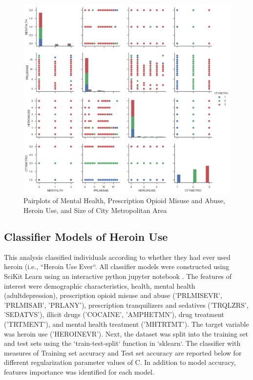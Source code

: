 \documentclass[sigconf]{acmart}
\begin{document}
\begin{figure}[!ht]
  \centering\includegraphics[width=\columnwidth]{images/Figure3.pdf}
  \caption{Pairplots of Mental Health, Prescription Opioid Misuse and Abuse,
  Heroin Use, and Size of City Metropolitan Area}
  \label{f:Figure3}
\end{figure}


\subsection{Classifier Models of Heroin Use}

This analysis classified individuals according to whether they had ever used 
heroin (i.e., ``Heroin Use Ever``. All classifier models were constructed 
using SciKit Learn \cite{muller17} using an interactive python jupyter notebook  
\cite{classifyH}. The features of interest were demographic characteristics, 
health, mental health (adultdepression), prescription opioid misuse and abuse ('PRLMISEVR', 'PRLMISAB', 'PRLANY'), prescription tranquilizers and sedatives 
('TRQLZRS', 'SEDATVS'), illicit drugs ('COCAINE', 'AMPHETMN'), drug treatment 
('TRTMENT'), and mental health treatment ('MHTRTMT'). The target variable was 
heroin use ('HEROINEVR'). Next, the dataset was split into the training set 
and test sets using the `train-test-split` function in `sklearn`. The 
classifier with measures of Training set accuracy and Test set accuracy are
reported below for different regularization parameter values of C. In addition 
to model accuracy, features importance was identified for each model. 
\end{document}
